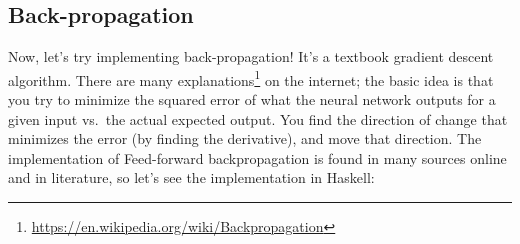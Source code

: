 \documentclass[]{article}
\renewcommand{\href}[2]{#2\footnote{\url{#1}}}
\begin{document}
\subsection{Back-propagation}\label{back-propagation}

Now, let's try implementing back-propagation! It's a textbook gradient
descent algorithm. There are
\href{https://en.wikipedia.org/wiki/Backpropagation}{many explanations}
on the internet; the basic idea is that you try to minimize the squared
error of what the neural network outputs for a given input vs.~the
actual expected output. You find the direction of change that minimizes
the error (by finding the derivative), and move that direction. The
implementation of Feed-forward backpropagation is found in many sources
online and in literature, so let's see the implementation in Haskell:
\end{document}
